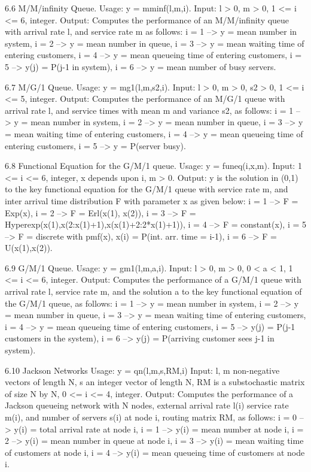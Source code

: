 6.6 M/M/infinity Queue.
Usage:  y = mminf(l,m,i).
Input: l > 0, m > 0,  1 <= i <= 6, integer.
Output: Computes the performance of an M/M/infinity queue with arrival rate l, and service rate m as follows: 
i = 1 --> y = mean number in system,
i = 2 --> y = mean number in queue,
i = 3 --> y = mean waiting time of entering customers,
i = 4 --> y = mean queueing time of entering customers,
i = 5 --> y(j) = P(j-1  in system),
i = 6 --> y = mean number of busy servers.

6.7 M/G/1 Queue.
Usage:  y = mg1(l,m,s2,i).
Input: l > 0, m > 0, s2 > 0,  1 <= i <= 5, integer.
Output: Computes the performance of an M/G/1 queue with arrival rate l, and service times with mean m and variance s2, as follows: 
i = 1 --> y = mean number in system,
i = 2 --> y = mean number in queue,
i = 3 --> y = mean waiting time of entering customers,
i = 4 --> y = mean queueing time of entering customers,
i = 5 --> y = P(server busy).

6.8 Functional Equation for the G/M/1 queue.
Usage:  y = funeq(i,x,m).
Input: 1 <= i <= 6, integer, x depends upon i, m > 0.  
Output: y is the solution in (0,1) to the key functional equation for the G/M/1 queue with service rate m, and inter arrival time distribution F with parameter x as given below:
i = 1 --> F =  Exp(x),
i = 2 --> F =  Erl(x(1), x(2)),
i = 3 --> F = Hyperexp(x(1),x(2:x(1)+1),x(x(1)+2:2*x(1)+1)),
i = 4 --> F =  constant(x),
i = 5 --> F = discrete with pmf(x), x(i) = P(int. arr. time = i-1),
i = 6 --> F = U(x(1),x(2)).

6.9 G/M/1 Queue.
Usage:  y = gm1(l,m,a,i).
Input: l > 0, m > 0, 0 < a < 1,  1 <= i <= 6, integer.
Output: Computes the performance of a G/M/1 queue with arrival rate l, service rate m, and the solution a to the key functional equation of the G/M/1 queue, as follows: 
i = 1 --> y = mean number in system,
i = 2 --> y = mean number in queue,
i = 3 --> y = mean waiting time of entering customers,
i = 4 --> y = mean queueing time of entering customers,
i = 5 --> y(j) = P(j-1  customers in the system),
i = 6 --> y(j) = P(arriving customer sees j-1 in system).

6.10 Jackson Networks
Usage:  y = qn(l,m,s,RM,i)
Input: l, m non-negative vectors of length N, s an integer vector of 
length N, RM is a substochastic matrix of size N by N,  0 <= i <= 4, integer.
Output: Computes the performance of a Jackson queueing network with N nodes, 
external arrival rate l(i) service rate m(i), and number of servers s(i) 
at node i, routing matrix RM, as follows:
i = 0 --> y(i) = total arrival rate at node i, 
i = 1 --> y(i) = mean number at node i,
i = 2 --> y(i) = mean number in queue at node i,
i = 3 --> y(i) = mean waiting time of  customers at node i,
i = 4 --> y(i) = mean queueing time of customers at node i.


